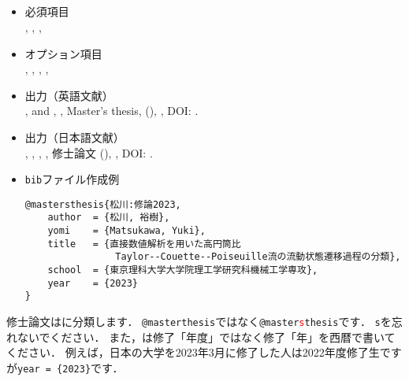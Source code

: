 \documentclass[a4paper,fleqn,uplatex,dvipdfmx]{jsarticle}
\begin{document}
\subsection{\ttmastersthesis}
\label{ssec:mastersthesis}
\begin{tcolorbox}[enhanced, title=\ttmastersthesis, drop fuzzy shadow]
    \begin{itemize}
        \item 必須項目 \\
        \ttauthor, \tttitle, \ttschool, \ttyear
        \item オプション項目 \\
        \ttaddress, \ttmonth, \ttnote, \ttkey, \ttdoi
        \item 出力（英語文献） \\
            \colorbox[gray]{0.8}{\ttauthorf}, \colorbox[gray]{0.8}{\ttauthors} and \colorbox[gray]{0.8}{\ttauthort}, \colorbox[gray]{0.8}{\tttitle}, Master's thesis, \colorbox[gray]{0.8}{\ttschool} (\colorbox[gray]{0.8}{\ttyear}), \colorbox[gray]{0.8}{\ttnote}, DOI: \colorbox[gray]{0.8}{\ttdoi}.
        \item 出力（日本語文献） \\
            \colorbox[gray]{0.8}{\ttauthorf}, \colorbox[gray]{0.8}{\ttauthors}, \colorbox[gray]{0.8}{\ttauthort}, \colorbox[gray]{0.8}{\tttitle}, \colorbox[gray]{0.8}{\ttschool}修士論文 (\colorbox[gray]{0.8}{\ttyear}), \colorbox[gray]{0.8}{\ttnote}, DOI: \colorbox[gray]{0.8}{\ttdoi}.
        \item \verb|bib|ファイル作成例 \vspace{-3mm}
\begin{verbatim}
@mastersthesis{松川:修論2023,
    author  = {松川, 裕樹},
    yomi    = {Matsukawa, Yuki},
    title   = {直接数値解析を用いた高円筒比
                Taylor--Couette--Poiseuille流の流動状態遷移過程の分類},
    school  = {東京理科大学大学院理工学研究科機械工学専攻},
    year    = {2023}
}
\end{verbatim}
    \end{itemize}
\end{tcolorbox}

修士論文は\ttmastersthesis に分類します．
\verb|@masterthesis|ではなく\texttt{@master\textcolor{red}{s}thesis}です．
\verb|s|を忘れないでください．
また，\ttyear は修了「年度」ではなく修了「年」を西暦で書いてください．
例えば，日本の大学を2023年3月に修了した人は2022年度修了生ですが\verb|year = {2023}|です．
\end{document}
